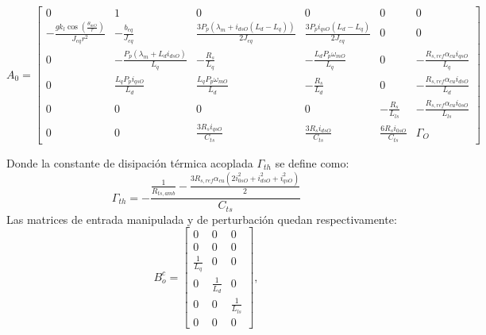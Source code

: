 \documentclass[12pt, a4paper,journal, onecolumn, compsoc]{IEEEtran}
\begin{document}
\begin{equation*}
A_0 = \begin{bmatrix}
0 & 1 & 0 & 0 & 0 & 0 \\
-\frac{g k_l \cos\left(\frac{\theta_{mO}}{r}\right)}{J_{eq} r^2} & -\frac{b_{eq}}{J_{eq}} & \frac{3 P_p (\lambda_m + i_{dsO} (L_d - L_q))}{2 J_{eq}} & \frac{3 P_p i_{qsO} (L_d - L_q)}{2 J_{eq}} & 0 & 0 \\
0 & -\frac{P_p (\lambda_m + L_d i_{dsO})}{L_q} & -\frac{R_s}{L_q} & -\frac{L_d P_p \omega_{mO}}{L_q} & 0 & -\frac{R_{s,ref} \alpha_{cu} i_{qsO}}{L_q} \\
0 & \frac{L_q P_p i_{qsO}}{L_d} & \frac{L_q P_p \omega_{mO}}{L_d} & -\frac{R_s}{L_d} & 0 & -\frac{R_{s,ref} \alpha_{cu} i_{dsO}}{L_d} \\
0 & 0 & 0 & 0 & -\frac{R_s}{L_{ls}} & -\frac{R_{s,ref} \alpha_{cu} i_{0sO}}{L_{ls}} \\
0 & 0 & \frac{3 R_s i_{qsO}}{C_{ts}} & \frac{3 R_s i_{dsO}}{C_{ts}} & \frac{6 R_s i_{0sO}}{C_{ts}} & \Gamma_{O}
\end{bmatrix}
\end{equation*}

Donde la constante de disipación térmica acoplada $\Gamma_{th}$ se define como:
\begin{equation*}
\Gamma_{th} = -\frac{\frac{1}{R_{ts,amb}} - \frac{3 R_{s,ref} \alpha_{cu} (2 i_{0sO}^2 + i_{dsO}^2 + i_{qsO}^2)}{2}}{C_{ts}}
\end{equation*}
Las matrices de entrada manipulada y de perturbación quedan respectivamente:
\begin{equation*}
B_o^c = \begin{bmatrix}
0 & 0 & 0 \\
0 & 0 & 0 \\
\frac{1}{L_q} & 0 & 0 \\
0 & \frac{1}{L_d} & 0 \\
0 & 0 & \frac{1}{L_{ls}} \\
0 & 0 & 0
\end{bmatrix} ,
\end{equation*}
\end{document}
